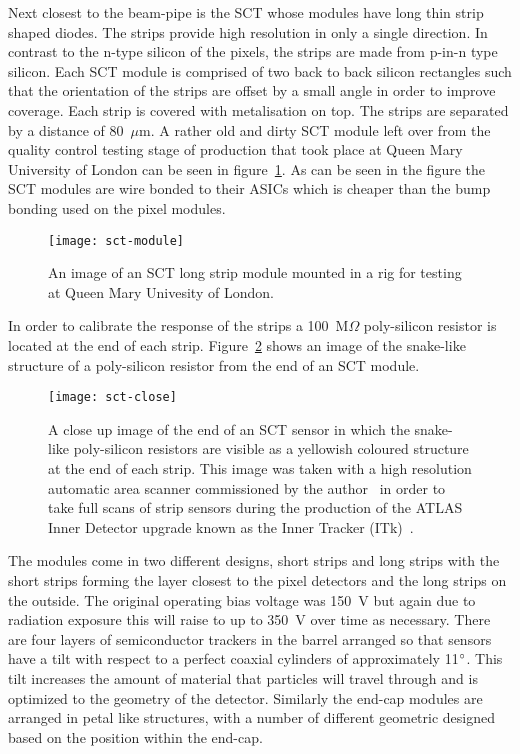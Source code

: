 Next closest to the beam-pipe is the SCT whose modules have long thin strip
shaped diodes. The strips provide high resolution in only a single direction. In
contrast to the n-type silicon of the pixels, the strips are made from p-in-n
type silicon. Each SCT module is comprised of two back to back silicon
rectangles such that the orientation of the strips are offset by a small angle
in order to improve coverage. Each strip is covered with metalisation on top.
The strips are separated by a distance of 80~$\mu$m. A rather old and dirty SCT
module left over from the quality control testing stage of production that took
place at Queen Mary University of London can be seen in
figure~\ref{fig:strip-module}. As can be seen in the figure the SCT modules are
wire bonded to their ASICs which is cheaper than the bump bonding used on the
pixel modules.
\begin{figure}[ht]
  \centering
  \texttt{[image: sct-module]}
  \caption[ATLAS long strip module]{An image of an SCT long strip module
    mounted in a rig for testing at Queen Mary Univesity of London.}
  \label{fig:strip-module}
\end{figure}
In order to calibrate the response of the strips a 100~M$\Omega$ poly-silicon
resistor is located at the end of each strip. Figure~\ref{fig:sct-close} shows an
image of the snake-like structure of a poly-silicon resistor from the end of an
SCT module.
\begin{figure}[ht]
  \centering
  \texttt{[image: sct-close]}
  \caption[ATLAS strip close-up]{A close up image of the end of an SCT sensor in
    which the snake-like poly-silicon resistors are visible as a yellowish
    coloured structure at the end of each strip. This image was taken with a
    high resolution automatic area scanner commissioned by the
    author~\cite{itk-scanner} in order to take full scans of strip sensors
    during the production of the ATLAS Inner Detector upgrade known as the Inner
    Tracker (ITk)~\cite{itk-tdr, itk-strips-tdr}.}
  \label{fig:sct-close}
\end{figure}
The modules come in two different designs, short strips and long
strips with the short strips forming the layer closest to the pixel detectors
and the long strips on the outside. The original operating bias voltage was
150~V but again due to radiation exposure this will raise to up to 350~V over
time as necessary. There are four layers of semiconductor trackers in the barrel
arranged so that sensors have a tilt with respect to a perfect coaxial cylinders
of approximately 11$\degree$. This tilt increases the amount of material that
particles will travel through and is optimized to the geometry of the detector.
Similarly the end-cap modules are arranged in petal like structures, with a
number of different geometric designed based on the position within the end-cap.

